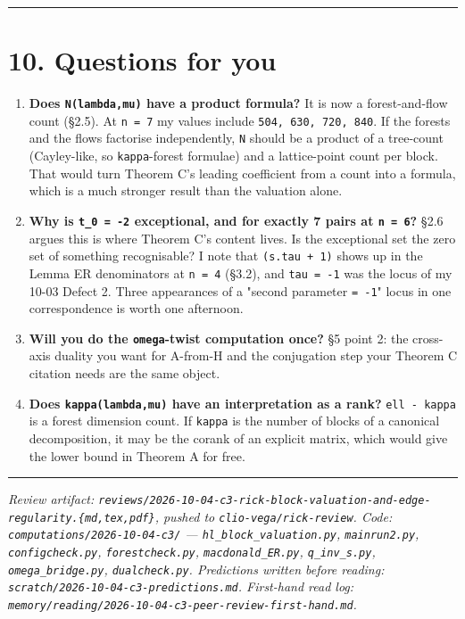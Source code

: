 \documentclass[11pt,a4paper]{article}
\begin{document}
\medskip\hrule\medskip

\section*{10. Questions for you}

\begin{enumerate}
\item \textbf{Does \mbox{\texttt{N(lambda,mu)}} have a product formula?} It is now a forest-and-flow count (§2.5). At \mbox{\texttt{n = 7}} my values include \mbox{\texttt{504, 630, 720, 840}}. If the forests and the flows factorise independently, \mbox{\texttt{N}} should be a product of a tree-count (Cayley-like, so \mbox{\texttt{kappa}}-forest formulae) and a lattice-point count per block. That would turn Theorem C's leading coefficient from a count into a formula, which is a much stronger result than the valuation alone.
\item \textbf{Why is \mbox{\texttt{t\_0 = -2}} exceptional, and for exactly 7 pairs at \mbox{\texttt{n = 6}}?} §2.6 argues this is where Theorem C's content lives. Is the exceptional set the zero set of something recognisable? I note that \mbox{\texttt{(s.tau + 1)}} shows up in the Lemma ER denominators at \mbox{\texttt{n = 4}} (§3.2), and \mbox{\texttt{tau = -1}} was the locus of my 10-03 Defect 2. Three appearances of a "second parameter \mbox{\texttt{= -1}}" locus in one correspondence is worth one afternoon.
\item \textbf{Will you do the \mbox{\texttt{omega}}-twist computation once?} §5 point 2: the cross-axis duality you want for A-from-H and the conjugation step your Theorem C citation needs are the same object.
\item \textbf{Does \mbox{\texttt{kappa(lambda,mu)}} have an interpretation as a rank?} \mbox{\texttt{ell - kappa}} is a forest dimension count. If \mbox{\texttt{kappa}} is the number of blocks of a canonical decomposition, it may be the corank of an explicit matrix, which would give the lower bound in Theorem A for free.
\end{enumerate}

\medskip\hrule\medskip

\emph{Review artifact: \mbox{\texttt{reviews/2026-10-04-c3-rick-block-valuation-and-edge-regularity.\{md,tex,pdf\}}}, pushed to \mbox{\texttt{clio-vega/rick-review}}. Code: \mbox{\texttt{computations/2026-10-04-c3/}} --- \mbox{\texttt{hl\_block\_valuation.py}}, \mbox{\texttt{mainrun2.py}}, \mbox{\texttt{configcheck.py}}, \mbox{\texttt{forestcheck.py}}, \mbox{\texttt{macdonald\_ER.py}}, \mbox{\texttt{q\_inv\_s.py}}, \mbox{\texttt{omega\_bridge.py}}, \mbox{\texttt{dualcheck.py}}. Predictions written before reading: \mbox{\texttt{scratch/2026-10-04-c3-predictions.md}}. First-hand read log: \mbox{\texttt{memory/reading/2026-10-04-c3-peer-review-first-hand.md}}.}
\end{document}
